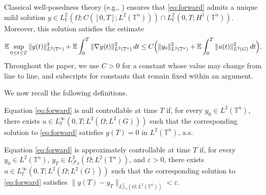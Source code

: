 \documentclass[print,wide]{draft}
\begin{document}
Classical well-posedness theory 
(e.g., \cite[Theorems~3.18 and~3.20]{Lue2021a}) ensures that \eqref{eq:forward} admits a unique mild solution
$
y\in L^2_{\mathbb F}(\Omega;C([0,T];L^2(\mathbb T^n)))
\cap L^2_{\mathbb F}(0,T;H^1(\mathbb T^n)).
$
Moreover, this solution satisfies the estimate
\begin{align}\label{eq:forward-solution-estimate}
\mathbb{E}\sup_{0\leq t\leq T}\|y(t)\|_{L^2(\mathbb T^n)}^2
+\mathbb{E}\int_0^T\|\nabla y(t)\|_{L^2(\mathbb T^n)}^2\,dt
\leq C\Bigl(\|y_0\|_{L^2(\mathbb T^n)}^2
+\mathbb{E}\int_0^T\|u(t)\|_{L^2(G)}^2\,dt\Bigr).
\end{align}
%
Throughout the paper,  we use $C>0$ for a constant whose value
may change from line to line, and subscripts for constants that remain fixed
within an argument. 


We now recall the following definitions.

\begin{definition}
Equation \eqref{eq:forward} is null controllable at time
$T$ if, for every $y_0\in L^2(\mathbb{T}^n)$, there exists
$u\in L^\infty_{\mathbb F}(0,T;L^2(\Omega;L^2(G)))$ such that
the corresponding solution to \eqref{eq:forward} satisfies
$y(T)=0$ in $L^2(\mathbb{T}^n)$, a.s.
\end{definition}

\begin{definition}
Equation \eqref{eq:forward} is approximately controllable at time $T$ if,
for every $y_0\in L^2(\mathbb{T}^n)$,
$y_T\in L^2_{\mathcal{F}_T}(\Omega;L^2(\mathbb{T}^n))$, and $\varepsilon>0$, there exists
$u\in L^\infty_{\mathbb F}(0,T;L^2(\Omega;L^2(G)))$ such that the corresponding solution to
\eqref{eq:forward} satisfies
$\lVert y(T)-y_T\rVert_{L^2_{\mathcal{F}_T}(\Omega;L^2(\mathbb{T}^n))}<\varepsilon$.
\end{definition} 
\end{document}
